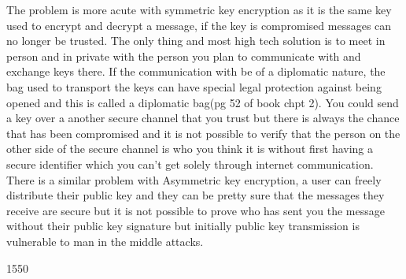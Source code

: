 The problem is more acute with symmetric key encryption as it is the same key used to encrypt and decrypt a message, if the key is compromised messages can no longer be trusted. The only thing and most high tech solution is to meet in person and in private with the person you plan to communicate with and exchange keys there. If the communication with be of a diplomatic nature, the bag used to transport the keys can have special legal protection against being opened and this is called a diplomatic bag(pg 52 of book chpt 2). You could send a key over a another secure channel that you trust but there is always the chance that has been compromised and it is not possible to verify that the person on the other side of the secure channel is who you think it is without first having a secure identifier which you can't get solely through internet communication. There is a similar problem with Asymmetric key encryption, a user can freely distribute their public key and they can be pretty sure that the messages they receive are secure but it is not possible to prove who has sent you the message without their public key signature but initially public key transmission is vulnerable to man in the middle attacks.

1550